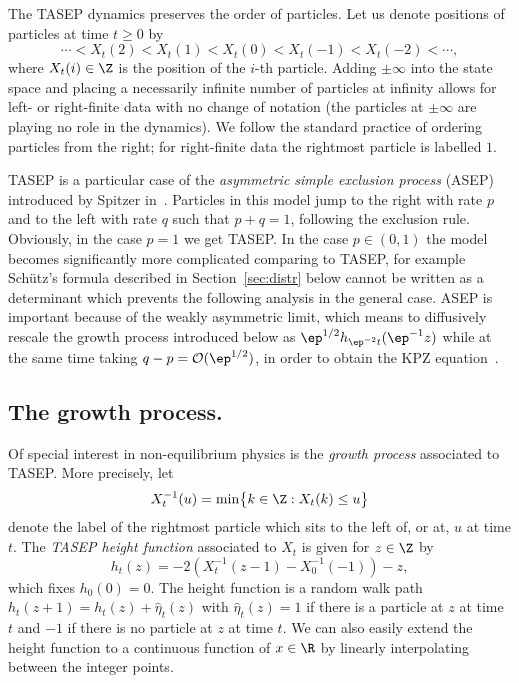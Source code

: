 \documentclass[]{pcmi}
\theoremstyle{plain}
\theoremstyle{definition}
\begin{document}
\noindent The TASEP dynamics preserves the order of particles. Let us denote positions of particles at time $t \geq 0$ by
\[
 	\cdots <X_t(2)<X_t(1)< X_t(0)< X_t(-1)<X_t(-2)< \cdots,
\]
where $X_t(i) \in \Z$ is the position of the $i$-{th} particle. Adding $\pm\infty$ into the state space and placing a necessarily infinite number of particles at infinity allows for left- or right-finite data with no change of notation (the particles at $\pm\infty$ are playing no role in the dynamics). We follow the standard
practice of ordering particles from the right; for right-finite data the rightmost particle is labelled $1$. 

TASEP is a particular case of the \emph{asymmetric simple exclusion process} (ASEP) introduced by Spitzer in~\cite{Spitzer}. Particles in this model jump to the right with rate $p$ and to the left with rate $q$ such that $p + q = 1$, following the exclusion rule. Obviously, in the case $p = 1$ we get TASEP. In the case $p \in (0,1)$ the model becomes significantly more complicated comparing to TASEP, for example Sch\"{u}tz's formula described in Section~\ref{sec:distr} below cannot be written as a determinant which prevents the following analysis in the general case.
ASEP is important because of the weakly asymmetric limit, which means to diffusively rescale the growth process introduced below as
$\ep^{1/2} h_{\ep^{-2} t}(\ep^{-1} z)$ while at the same time taking $q-p=\mathcal{O}(\ep^{1/2})$, in order to obtain the KPZ equation~\cite{berGiaco}.

\subsection{The growth process.}
\label{sec:growth}

Of special interest in non-equilibrium physics is the \emph{growth process} associated to TASEP. More precisely, let 
\[
X^{-1}_t(u) = \min \bigl\{k \in \Z : X_t(k) \leq u\bigr\}
\]
denote the label of the rightmost particle which sits to the left of, or at, $u$ at time $t$. 
The \emph{TASEP  height function} associated to $X_t$ is given for $z\in\Z$ by 
\begin{equation}\label{defofh}
 h_t(z) = -2 \left(X_t^{-1}(z-1) - X_0^{-1}(-1) \right) - z,
\end{equation}
which fixes $h_0(0)=0$. The height function is a random walk path $h_t(z+1) = h_t(z) +\hat{\eta}_t(z)$ with $\hat{\eta}_t(z)=1$ if there is a particle at $z$ at time $t$ and $-1$ if there is no particle at $z$ at time $t$.  We can also easily extend the height function to a continuous function of $x\in \R$ by linearly interpolating between the integer points. 
\end{document}
